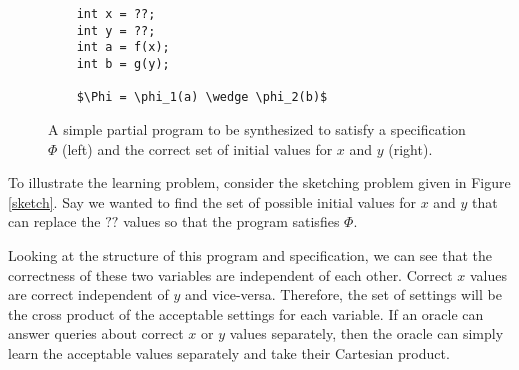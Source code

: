 \begin{figure}[h]
\centering
\begin{minipage}[b]{0.4 \textwidth}
\begin{lstlisting}
    int x = ??;
    int y = ??;
    int a = f(x);
    int b = g(y);
    
    $\Phi = \phi_1(a) \wedge \phi_2(b)$
\end{lstlisting}
\end{minipage}
\qquad
\caption{A simple partial program to be synthesized to satisfy a specification $\Phi$ (left) and the correct set of initial values for $x$ and $y$ (right).}
\label{sketch}
\label{sketchsolutions}
\end{figure}

To illustrate the learning problem, consider the sketching problem given in Figure \ref{sketch}.
Say we wanted to find the set of possible initial values for $x$ and $y$ that can replace the $??$ values so that the program satisfies $\Phi$.

Looking at the structure of this program and specification, we can see that the correctness of these two variables are independent of each other. 
Correct $x$ values are correct independent of $y$ and vice-versa.
Therefore, the set of settings will be the cross product of the acceptable settings for each variable.  
If an oracle can answer queries about correct $x$ or $y$ values separately, then the oracle can simply learn the acceptable values separately and take their Cartesian product. 

